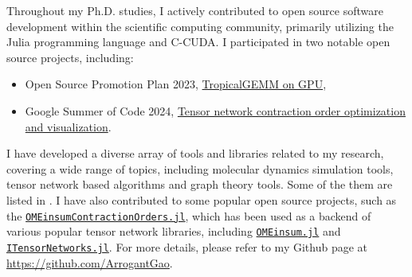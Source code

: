 Throughout my Ph.D. studies, I actively contributed to open source software development within the scientific computing community, primarily utilizing the Julia programming language and C-CUDA.
I participated in two notable open source projects, including:
\begin{itemize}
    \item Open Source Promotion Plan 2023, \href{https://summer-ospp.ac.cn/2023/org/prodetail/23fec0105?lang=en&list=pro}{TropicalGEMM on GPU},
    \item Google Summer of Code 2024, \href{https://summerofcode.withgoogle.com/programs/2024/projects/B8qSy9dO}{Tensor network contraction order optimization and visualization}.
\end{itemize}

I have developed a diverse array of tools and libraries related to my research, covering a wide range of topics, including molecular dynamics simulation tools, tensor network based algorithms and graph theory tools. 
Some of the them are listed in .
I have also contributed to some popular open source projects, such as the \href{https://github.com/TensorBFS/OMEinsumContractionOrders.jl}{\texttt{OMEinsumContractionOrders.jl}}, which has been used as a backend of various popular tensor network libraries, including \href{https://github.com/under-Peter/OMEinsum.jl}{\texttt{OMEinsum.jl}} and \href{https://github.com/ITensor/ITensorNetworks.jl}{\texttt{ITensorNetworks.jl}}.
For more details, please refer to my Github page at \href{https://github.com/ArrogantGao}{https://github.com/ArrogantGao}.
